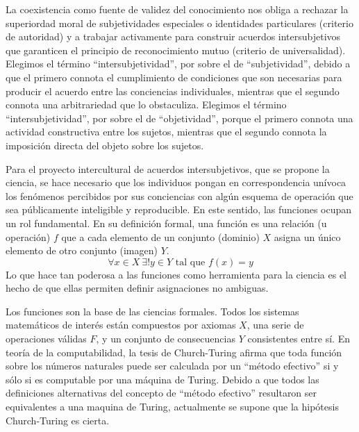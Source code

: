 \documentclass[a4paper,10pt]{book}
\theoremstyle{definition}
\begin{document}

La coexistencia como fuente de validez del conocimiento nos obliga a rechazar la superiordad moral de subjetividades especiales o identidades particulares (criterio de autoridad) y a trabajar activamente para construir acuerdos intersubjetivos que garanticen el principio de reconocimiento mutuo (criterio de universalidad).
%
Elegimos el t\'ermino ``intersubjetividad'', por sobre el de ``subjetividad'', debido a que el primero connota el cumplimiento de condiciones que son necesarias para producir el acuerdo entre las conciencias individuales, mientras que el segundo connota una arbitrariedad que lo obstaculiza.
%
Elegimos el t\'ermino ``intersubjetividad'', por sobre el de ``objetividad'', porque el primero connota una actividad constructiva entre los sujetos, mientras que el segundo connota la imposici\'on directa del objeto sobre los sujetos.


Para el proyecto intercultural de acuerdos intersubjetivos, que se propone la ciencia, se hace necesario que los individuos pongan en correspondencia un\'ivoca los fen\'omenos percibidos por sus conciencias con algún esquema de operaci\'on que sea públicamente inteligible y reproducible.
% 
En este sentido, las funciones ocupan un rol fundamental.
%
En su definici\'on formal, una funci\'on es una relaci\'on (u operaci\'on) $f$ que a cada elemento de un conjunto (dominio) $X$ asigna un único elemento de otro conjunto (imagen) $Y$.
%
\begin{equation}
 \forall x \in X \  \exists! y \in Y \text{ tal que } f(x) = y    
\end{equation}
%
Lo que hace tan poderosa a las funciones como herramienta para la ciencia es el hecho de que ellas permiten definir asignaciones no ambiguas.


Los funciones son la base de las ciencias formales.
%
Todos los sistemas matem\'aticos de inter\'es est\'an compuestos por axiomas $X$, una serie de operaciones v\'alidas $F$, y un conjunto de consecuencias $Y$ consistentes entre s\'i.
%
En teor\'ia de la computabilidad, la tesis de Church-Turing afirma que toda funci\'on sobre los números naturales puede ser calculada por un ``m\'etodo efectivo'' si y s\'olo si es computable por una m\'aquina de Turing.
%
Debido a que todos las definiciones alternativas del concepto  de ``m\'etodo efectivo'' resultaron ser equivalentes a una maquina de Turing, actualmente se supone que la hip\'otesis Church-Turing es cierta.
\end{document}
